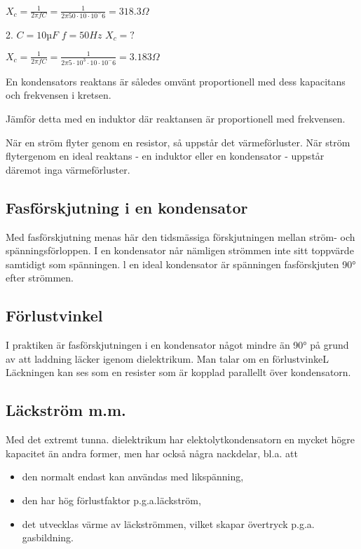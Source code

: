 \(X_c = \frac{1}{2πfC} = \frac{1}{2π 50 \cdot 10 \cdot 10^-6} = 318.3 Ω\)

2. \(C = 10 µF\) \(f = 50 Hz\) \(X_c = ?\)

\(X_c = \frac{1}{2πfC} = \frac{1}{2π 5 \cdot 10^3 \cdot 10 \cdot 10^-6}
= 3.183 Ω\)

En kondensators reaktans är således omvänt proportionell med dess kapacitans
och frekvensen i kretsen.

Jämför detta med en induktor där reaktansen är proportionell med frekvensen.

När en ström flyter genom en resistor, så uppstår det värmeförluster. När ström
flytergenom en ideal reaktans - en induktor eller en kondensator - uppstår
däremot inga värmeförluster.

\subsection{Fasförskjutning i en kondensator}

Med fasförskjutning menas här den tidsmässiga förskjutningen mellan ström- och
spänningsförloppen. I en kondensator når nämligen strömmen inte sitt toppvärde
samtidigt som spänningen. l en ideal kondensator är spänningen fasförskjuten 90°
efter strömmen.

\subsection{Förlustvinkel}

I praktiken är fasförskjutningen i en kondensator något mindre än 90° på grund
av att laddning läcker igenom dielektrikum. Man talar om en förlustvinkeL
Läckningen kan ses som en resister som är kopplad parallellt över kondensatorn.


\subsection{Läckström m.m.}

Med det extremt tunna. dielektrikum har elektolytkondensatorn en mycket högre
kapacitet än andra former, men har också några nackdelar, bl.a. att
\begin{itemize}
  \item den normalt endast kan användas med likspänning,
  \item den har hög förlustfaktor p.g.a.läckström,
  \item det utvecklas värme av läckströmmen, vilket skapar övertryck p.g.a.
    gasbildning.
\end{itemize}


